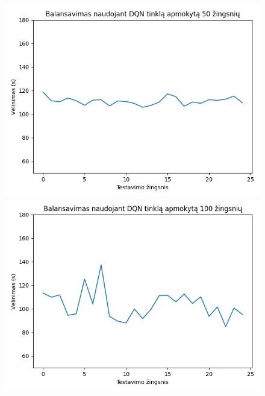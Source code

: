 \documentclass{VUMIFPSbakalaurinis}
\begin{document}
\begin{figure}[H]
    \centering
    \begin{minipage}[b]{0.45\textwidth}
        \includegraphics[width=\textwidth]{img/dqn_50_2.png}
    \end{minipage}
    \hspace{1mm}
    \begin{minipage}[b]{0.45\textwidth}
        \includegraphics[width=\textwidth]{img/dqn_100_2.png}
    \end{minipage}
    \hspace{1mm}
    \begin{minipage}[b]{0.45\textwidth}

\end{minipage}
\end{figure}
\end{document}
